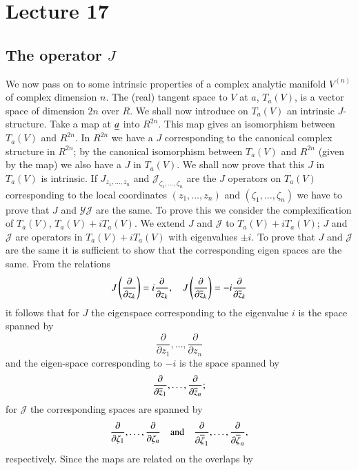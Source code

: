 \chapter{Lecture 17}

\section*{The operator $J$}\pageoriginale


We now pass on to some intrinsic properties of a complex analytic
manifold $V^{(n)}$ of complex dimension $n$. The (real) tangent space
to $V$ at $a$, $T_{a}(V)$, is a vector space of dimension $2n$ over
$R$. We shall now introduce on $T_{a}(V)$ an intrinsic
$J$-structure. Take a map at $\underline{a}$ into $R^{2n}$. This map gives an
isomorphism between $T_{a}(V)$ and $R^{2n}$. In $R^{2n}$ we have a $J$
corresponding to the canonical complex structure in $R^{2n}$; by the
canonical isomorphism between $T_{a}(V)$ and $R^{2n}$ (given by the
map) we also have a $J$ in $T_{a}(V)$. We shall now prove that this
$J$ in $T_{a}(V)$ is intrinsic. If $J_{z_{1},\ldots,z_{n}}$ and
$\mathscr{J}_{\zeta_{1},\ldots,\zeta_{n}}$ are the $J$ operators on
$T_{a}(V)$ corresponding to the local coordinates
$(z_{1},\ldots,z_{n})$ and $(\zeta_{1},\ldots,\zeta_{n})$ we have to
prove that $J$ and $\mathscr{YJ}$ are the same. To prove this we
  consider the complexification of $T_{a}(V)$,
  $T_{a}(V)+iT_{a}(V)$. We extend $J$ and $\mathscr{J}$ to
  $T_{a}(V)+iT_{a}(V)$; $J$ 
  and $\mathscr{J}$ are operators in $T_{a}(V)+iT_{a}(V)$ with
  eigenvalues $\pm i$. To prove that $J$ and $\mathscr{J}$ are the
  same it is sufficient to show that the corresponding eigen spaces
  are the same. From the relations
$$
J\left(\frac{\partial}{\partial
  z_{k}}\right)=i\frac{\partial}{\partial z_{k}},\quad
J\left(\frac{\partial}{\partial
  \overline{z}_{k}}\right)=-i\frac{\partial}{\partial \overline{z}_{k}}
$$
it follows that for $J$ the eigenspace corresponding to the eigenvalue
$i$ is the space spanned by 
$$
\frac{\partial}{\partial z_{1}},\ldots,\frac{\partial}{\partial z_{n}}
$$\pageoriginale
and the eigen-space corresponding to $-i$ is the space spanned by
$$
\frac{\partial}{\partial \overline{z}_{1}},\ldots,\frac{\partial}{\partial
  \overline{z}_{n}};
$$
for $\mathscr{J}$ the corresponding spaces are spanned by
$$
\frac{\partial}{\partial \zeta_{1}},\ldots,\frac{\partial}{\partial
  \zeta_{n}}\quad\text{and}\quad
\frac{\partial}{\partial\overline{\zeta}_{1}},\ldots,\frac{\partial}{\partial\overline{\zeta}_{n}}, 
$$
respectively. Since the maps are related on the overlaps by
